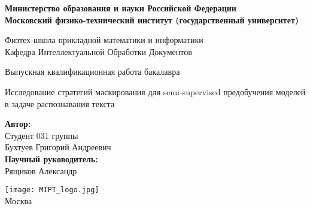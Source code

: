 \begin{center}
    \large\textbf{Министерство образования и науки Российской Федерации \\
    Московский физико-технический институт (государственный
    университет)} \\
    \vspace{1cm}

    Физтех-школа прикладной математики и информатики \\

    Кафедра Интеллектуальной Обработки Документов \\

    \vspace{3em}

    Выпускная квалификационная работа бакалавра
\end{center}

\begin{center}
    \vspace{\fill}
    \LARGE{Исследование стратегий маскирования для semi-supervised предобучения моделей в задаче распознавания текста}

    \vspace{\fill}
\end{center}


\begin{flushright}
    \textbf{Автор:} \\
    Студент 031 группы \\
    Бухтуев Григорий Андреевич \\
    \vspace{2em}
    \textbf{Научный руководитель:} \\
    Рящиков Александр \\
\end{flushright}

\vspace{7em}

\begin{center}
    \texttt{[image: MIPT\_logo.jpg]}\\
    Москва \the\year{}
\end{center}

\thispagestyle{empty}

\newpage
\setcounter{page}{2}
\fancyfoot[c]{\thepage}
\fancyhead[R]{}